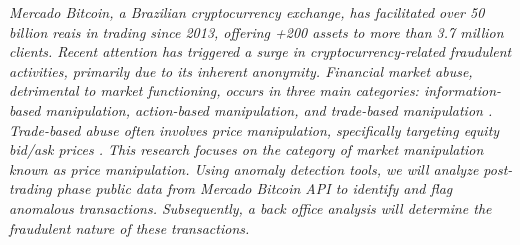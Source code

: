 \emph{Mercado Bitcoin, a Brazilian cryptocurrency exchange, has facilitated over 50 billion reais in trading since 2013,
offering +200 assets to more than 3.7 million clients. Recent attention has triggered a surge in cryptocurrency-related
fraudulent activities, primarily due to its inherent anonymity. Financial market abuse, detrimental to market
functioning, occurs in three main categories: information-based manipulation, action-based manipulation, and trade-based
manipulation \cite{allen1992stock}. Trade-based abuse often involves price manipulation, specifically targeting equity
bid/ask prices \cite{allen1992stock, allen2006large}.
This research focuses on the category of market manipulation known as price manipulation. Using anomaly detection tools,
we will analyze post-trading phase public data from Mercado Bitcoin API to identify and flag anomalous transactions.
Subsequently, a back office analysis will determine the fraudulent nature of these transactions.}
